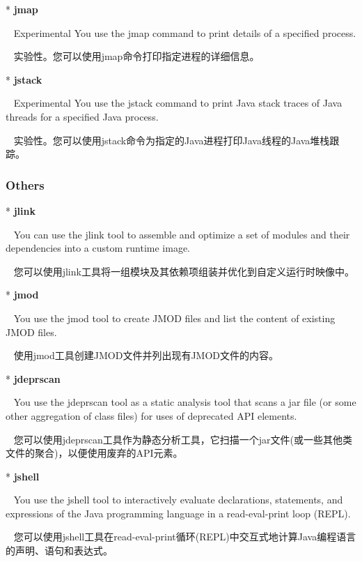 * \textbf{jmap}

~ Experimental You use the jmap command to print details of a specified process. 

~ 实验性。您可以使用jmap命令打印指定进程的详细信息。

* \textbf{jstack}

~ Experimental You use the jstack command to print Java stack traces of Java threads for a specified Java process. 

~ 实验性。您可以使用jstack命令为指定的Java进程打印Java线程的Java堆栈跟踪。\newline

\subsubsection{Others}

* \textbf{jlink}

~ You can use the jlink tool to assemble and optimize a set of modules and their dependencies into a custom runtime image.

~ 您可以使用jlink工具将一组模块及其依赖项组装并优化到自定义运行时映像中。

* \textbf{jmod}

~ You use the jmod tool to create JMOD files and list the content of existing JMOD files.

~ 使用jmod工具创建JMOD文件并列出现有JMOD文件的内容。

* \textbf{jdeprscan} 

~ You use the jdeprscan tool as a static analysis tool that scans a jar file (or some other aggregation of class files) for uses of deprecated API elements.

~ 您可以使用jdeprscan工具作为静态分析工具，它扫描一个jar文件(或一些其他类文件的聚合)，以便使用废弃的API元素。

* \textbf{jshell}

~ You use the jshell tool to interactively evaluate declarations, statements, and expressions of the Java programming language in a read-eval-print loop (REPL).

~ 您可以使用jshell工具在read-eval-print循环(REPL)中交互式地计算Java编程语言的声明、语句和表达式。




